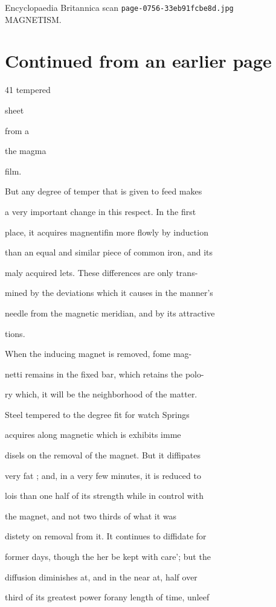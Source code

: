 \documentclass{article}
\begin{document}
\begin{center}
{\Large Encyclopaedia Britannica scan \texttt{page-0756-33eb91fcbe8d.jpg}}\\[0.5em]
MAGNETISM.
\end{center}
\section*{Continued from an earlier page}
41 tempered

sheet

from a

the magma

film.

But any degree of temper that is given to feed makes

a very important change in this respect. In the first

place, it acquires magnentifin more flowly by induction

than an equal and similar piece of common iron, and its

maly acquired lets. These differences are only trans-

mined by the deviations which it causes in the manner’s

needle from the magnetic meridian, and by its attractive

tions.

When the inducing magnet is removed, fome mag-

netti remains in the fixed bar, which retains the polo-

ry which, it will be the neighborhood of the matter.

Steel tempered to the degree fit for watch Springs

acquires along magnetic which is exhibits imme

disels on the removal of the magnet. But it diffipates

very fat ; and, in a very few minutes, it is reduced to

lois than one half of its strength while in control with

the magnet, and not two thirds of what it was

distety on removal from it. It continues to diffidate for

former days, though the her be kept with care'; but the

diffusion diminishes at, and in the near at, half over

third of its greatest power forany length of time, unleef
\end{document}
